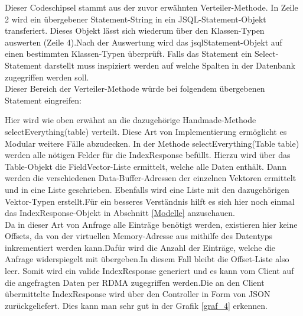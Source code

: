 Dieser Codeschipsel stammt aus der zuvor erwähnten Verteiler-Methode. In Zeile 2  wird ein übergebener Statement-String in ein JSQL-Statement-Objekt transferiert. Dieses Objekt lässt sich wiederum über den Klassen-Typen auswerten (Zeile 4).Nach der Auswertung wird das jsqlStatement-Objekt auf einen bestimmten Klassen-Typen überprüft. Falls das Statement ein Select-Statement darstellt muss inspiziert werden auf welche Spalten in der Datenbank zugegriffen werden soll.\\ 
Dieser Bereich der Verteiler-Methode würde bei folgendem übergebenen Statement eingreifen:

\begin{center}
\end{center}

Hier wird wie oben erwähnt an die dazugehörige Handmade-Methode selectEverything(table) verteilt. Diese Art von Implementierung ermöglicht es Modular weitere Fälle abzudecken.
In der Methode selectEverything(Table table) werden alle nötigen Felder für die IndexResponse befüllt. Hierzu wird über das Table-Objekt die FieldVector-Liste ermittelt, welche alle Daten enthält. Dann werden die verschiedenen Data-Buffer-Adressen der einzelnen Vektoren ermittelt und in eine Liste geschrieben. Ebenfalls wird eine Liste mit den dazugehörigen Vektor-Typen erstellt.Für ein besseres Verständnis hilft es sich hier noch einmal das IndexResponse-Objekt in Abschnitt \ref{Modelle} anzuschauen.\\
Da in dieser Art von Anfrage alle Einträge benötigt werden, existieren hier keine Offsets, da von der virtuellen Memory-Adresse aus mithilfe des Datentyps inkrementiert werden kann.Dafür wird die Anzahl der Einträge, welche die Anfrage widerspiegelt mit übergeben.In diesem Fall bleibt die Offset-Liste also leer.
Somit wird ein valide IndexResponse generiert und es kann vom Client auf die angefragten Daten per RDMA zugegriffen werden.Die an den Client übermittelte IndexResponse wird über den Controller in Form von JSON zurückgeliefert. Dies kann man sehr gut in der Grafik \ref{graf_4} erkennen.

